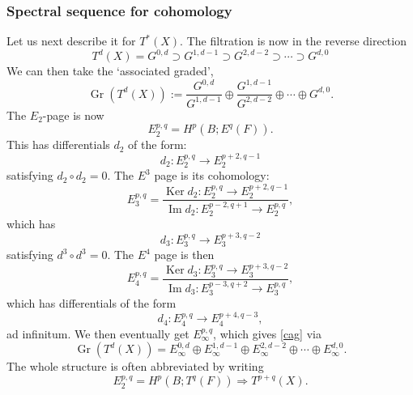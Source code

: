 \documentclass[12pt]{article}
\numberwithin{equation}{section}
\numberwithin{figure}{section}
\theoremstyle{remark}
\def\Gr{\mathop{\mathrm{Gr}}}
\def\Ker{\mathop{\mathrm{Ker}}}
\def\Im{\mathop{\mathrm{Im}}}
\begin{document}
\subsubsection{Spectral sequence for cohomology}
Let us next describe it for $T^*(X)$.
The  filtration is now in the reverse direction \begin{equation}
T^d(X)=G^{0,d} \supset G^{1,d-1} \supset G^{2,d-2} \supset \cdots \supset G^{d,0}
\end{equation} We can then take the `associated graded', \begin{equation}
\Gr(T^d(X)) := \frac{G^{0,d}}{G^{1,d-1}}\oplus \frac{G^{1,d-1}}{G^{2,d-2}}\oplus\cdots\oplus G^{d,0}.
\label{cag}
\end{equation}
The $E_2$-page is now \begin{equation}
E_2^{p,q} = H^p(B ; E^q(F)).
\end{equation}
This has differentials $d_2$ of the form: \begin{equation}
d_2\colon E_2^{p,q} \to E_2^{p+2,q-1}
\end{equation} satisfying $d_2\circ d_2=0$.
The $E^3$ page is its cohomology: \begin{equation}
E_3^{p,q}=\frac{\Ker d_2\colon E_2^{p,q}\to E_2^{p+2,q-1}}
{\Im d_2\colon E_2^{p-2,q+1} \to E_2^{p,q}} ,
\end{equation}
which has  \begin{equation}
d_3\colon E_3^{p,q} \to E_3^{p+3,q-2}
\end{equation} satisfying $d^3\circ d^3=0$.
The $E^4$ page is then \begin{equation}
E_4^{p,q}=\frac{\Ker d_3\colon E_3^{p,q}\to E_3^{p+3,q-2}}
{\Im d_3\colon E_3^{p-3,q+2} \to E_3^{p,q}} ,
\end{equation} which has differentials of the form \begin{equation}
d_4\colon E_4^{p,q} \to E_4^{p+4,q-3},
\end{equation} ad infinitum.
We then eventually get $E_\infty^{p,q}$, which gives \eqref{cag} via \begin{equation}
\Gr(T^d(X))= E_\infty^{0,d}\oplus E_\infty^{1,d-1} \oplus E_\infty^{2,d-2} \oplus \cdots \oplus E_\infty^{d,0}.
\end{equation}
The whole structure is often abbreviated by writing \begin{equation}
E_2^{p,q} = H^p(B;T^q(F)) \Rightarrow T^{p+q}(X).
\end{equation}
\end{document}
